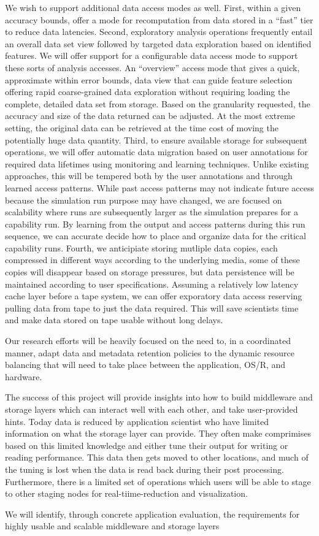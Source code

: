 \documentclass[11pt,letterpaper]{article}
\begin{document}
We wish to support additional data access modes as well. First, within a given
accuracy bounds, offer a mode for recomputation from data stored in a ``fast''
tier to reduce data latencies. Second, exploratory analysis operations
frequently entail an overall data set view followed by targeted data
exploration based on identified features. We will offer support for a
configurable data access mode to support these sorts of analysis accesses. An
``overview'' access mode that gives a quick, approximate within error bounds,
data view that can guide feature selection offering rapid coarse-grained data
exploration without requiring loading the complete, detailed data set from
storage. Based on the granularity requested, the accuracy and size of the data
returned can be adjusted. At the most extreme setting, the original data can
be retrieved at the time cost of moving the potentially huge data quantity.
Third, to ensure available storage for subsequent operations, we will offer
automatic data migration based on user annotations for required data lifetimes
using monitoring and learning techniques. Unlike existing approaches, this will
be tempered both by the user annotations and through learned access patterns.
While past access patterns may not indicate future access because the
simulation run purpose may have changed, we are focused on scalability where
runs are subsequently larger as the simulation prepares for a capability run.
By learning from the output and access patterns during this run sequence, we
can accurate decide how to place and organize data for the critical capability
runs. Fourth, we anticipiate storing mutliple data copies, each compressed in
different ways according to the underlying media, some of these copies will
disappear based on storage pressures, but data persistence will be maintained
according to user specifications. Assuming a relatively low latency cache layer
before a tape system, we can offer exporatory data access reserving pulling
data from tape to just the data required. This will save scientists time and
make data stored on tape usable without long delays.

Our research efforts will be heavily focused on the need to, in a coordinated
manner, adapt data and metadata retention policies to the dynamic
resource balancing that will need to take place between the application,
OS/R, and hardware.

The success of this project will  provide insights into how to build middleware and storage layers which can interact
well with each other, and take user-provided hints. Today data is reduced by application scientist who have 
limited information on what the storage layer can provide. They often make comprimises based on this limited knowledge
and either tune their output for writing or reading performance. This data then gets moved to other locations, and much of
the tuning is lost when the data is read back during their post processing. Furthermore, there is a limited set of operations
which users will be able to stage to other staging nodes for real-tiime-reduction and visualization. 

We will identify,   through concrete application evaluation, the requirements for highly 
usable and scalable middleware and storage layers




%
\end{document}
